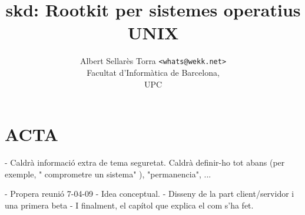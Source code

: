 \documentclass[a4paper]{report}
\author{Albert Sellarès Torra \texttt{<whats@wekk.net>}\\
		Facultat d'Informàtica de Barcelona,\\
		UPC\\}
\title{skd: Rootkit per sistemes operatius UNIX}
\begin{document}






















\appendix







\section{ACTA}

- Caldrà informació extra de tema seguretat. Caldrà definir-ho tot abans
(per exemple, " comprometre un sistema" ), "permanencia", ...

- Propera reunió 7-04-09
- Idea conceptual.
- Disseny de la part client/servidor i una primera beta
- I finalment, el capítol que explica el com s'ha fet.
\end{document}
